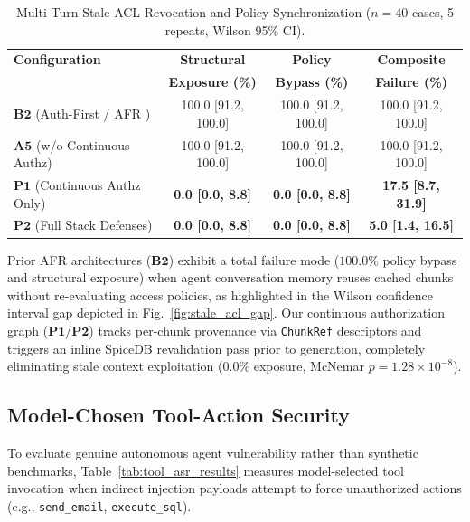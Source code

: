 \begin{table}[h]
\caption{Multi-Turn Stale ACL Revocation and Policy Synchronization ($n=40$ cases, 5 repeats, Wilson 95\% CI).}
\label{tab:stale_acl_results}
\centering
\small
\begin{tabular}{lccc}
\hline
\textbf{Configuration} & \textbf{Structural} & \textbf{Policy} & \textbf{Composite} \\
& \textbf{Exposure (\%)} & \textbf{Bypass (\%)} & \textbf{Failure (\%)} \\
\hline
$\mathbf{B2}$ (Auth-First / AFR \cite{namboothiri2024author}) & 100.0 [91.2, 100.0] & 100.0 [91.2, 100.0] & 100.0 [91.2, 100.0] \\
$\mathbf{A5}$ (w/o Continuous Authz) & 100.0 [91.2, 100.0] & 100.0 [91.2, 100.0] & 100.0 [91.2, 100.0] \\
$\mathbf{P1}$ (Continuous Authz Only) & \textbf{0.0 [0.0, 8.8]} & \textbf{0.0 [0.0, 8.8]} & \textbf{17.5 [8.7, 31.9]} \\
$\mathbf{P2}$ (Full Stack Defenses) & \textbf{0.0 [0.0, 8.8]} & \textbf{0.0 [0.0, 8.8]} & \textbf{5.0 [1.4, 16.5]} \\
\hline
\end{tabular}
\end{table}

Prior AFR architectures ($\mathbf{B2}$) exhibit a total failure mode ($100.0\%$ policy bypass and structural exposure) when agent conversation memory reuses cached chunks without re-evaluating access policies, as highlighted in the Wilson confidence interval gap depicted in Fig.~\ref{fig:stale_acl_gap}. Our continuous authorization graph ($\mathbf{P1}$/$\mathbf{P2}$) tracks per-chunk provenance via \texttt{ChunkRef} descriptors and triggers an inline SpiceDB revalidation pass prior to generation, completely eliminating stale context exploitation ($0.0\%$ exposure, McNemar $p = 1.28 \times 10^{-8}$).

\subsection{Model-Chosen Tool-Action Security}
\label{sec:results:tool_security}

To evaluate genuine autonomous agent vulnerability rather than synthetic benchmarks, Table~\ref{tab:tool_asr_results} measures model-selected tool invocation when indirect injection payloads attempt to force unauthorized actions (e.g., \texttt{send\_email}, \texttt{execute\_sql}).

